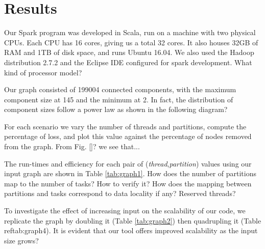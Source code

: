\section{Results}
\label{results}

Our Spark program was developed in Scala, run on a machine with two physical CPUs. Each CPU has 16 cores, giving us a total 32 cores. It also houses 32GB of RAM and 1TB of disk space, and runs Ubuntu 16.04. We also used the Hadoop distribution 2.7.2 and the Eclipse IDE configured for spark development. What kind of processor model?

Our graph consisted of 199004 connected components, with the maximum component size at 145 and the minimum at 2. In fact, the distribution of component sizes follow a power law as shown in the following diagram?

For each scenario we vary the number of threads and partitions, compute the percentage of loss, and plot this value against the percentage of nodes removed from the graph. From Fig. \ref{}? we see that...

The run-times and efficiency for each pair of ({\it thread},{\it partition}) values using our input graph are shown in Table \ref{tab:graph1}. How does the number of partitions map to the number of tasks? How to verify it? How does the mapping between partitions and tasks correspond to data locality if any? Reserved threads?

To investigate the effect of increasing input on the scalability of our code, we replicate the graph by doubling it (Table \ref{tab:graph2}) then quadrupling it (Table ref{tab:graph4}). It is evident that our tool offers improved scalability as the input size grows?



